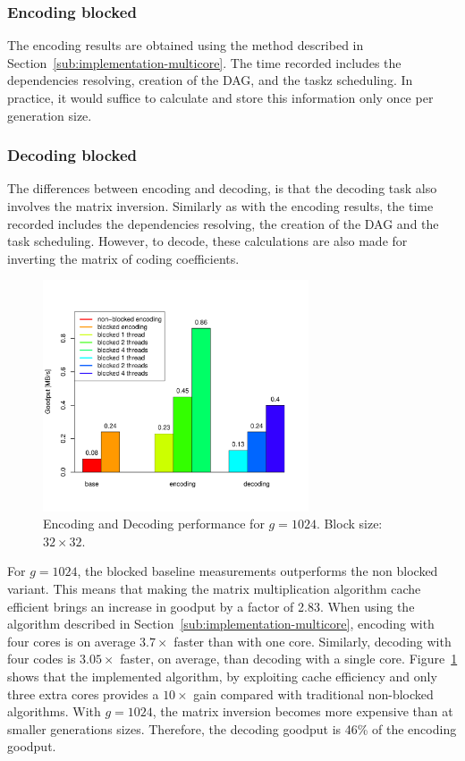 \subsubsection{Encoding blocked}
The encoding results are obtained using the
method described in Section~\ref{sub:implementation-multicore}. The time
recorded includes the dependencies resolving, creation of the \ac{DAG},
and the taskz scheduling. In practice, it would suffice to calculate and
store this information only once per generation size.

\subsubsection{Decoding blocked}
The differences between encoding and decoding, is that the decoding task
also involves the matrix inversion. Similarly as with the encoding results,
the time recorded includes the dependencies resolving, the creation of the
\ac{DAG} and the task scheduling. However, to decode, these calculations
are also made for inverting the matrix of coding coefficients.

\begin{figure}[ht!]
\centering
\includegraphics[width=0.7\textwidth]{images/2015-04-18_encoding_decoding_1024.pdf}
\caption{Encoding and Decoding performance for $g = 1024$. Block size: $32 \times 32$. \cite{wunderlich2015network}}
\label{enc_dec1024}
\end{figure}

For $g= 1024$, the blocked baseline measurements outperforms the non blocked
variant. This means that making the matrix multiplication algorithm cache
efficient brings an increase in goodput by a factor of 2.83. When using the
algorithm described in Section~\ref{sub:implementation-multicore},
encoding with four cores is on average $3.7\times$ faster than with one core.
Similarly, decoding with four codes is $3.05\times$ faster, on average, than
decoding with a single core. Figure~\ref{enc_dec1024} shows that the
implemented algorithm, by exploiting cache efficiency and only three extra
cores provides a $10\times$ gain compared with traditional non-blocked
algorithms. With $g = 1024$, the matrix inversion becomes more expensive
than at smaller generations sizes. Therefore, the decoding goodput
is 46\% of the encoding goodput.

